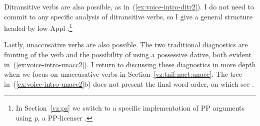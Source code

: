 \begin{exe}
\begin{xlist}
\begin{exe}
\begin{xlist}
\begin{exe}
\begin{xlist}
\begin{exe}
\begin{exe}
\begin{xlist}
\begin{exe}
\begin{xlist}
\begin{exe}
\begin{xlist}
\begin{exe}
\begin{xlist}
\begin{exe}
\begin{xlist}
\begin{exe}
\begin{xlist}
\begin{exe}
\begin{xlist}
\begin{exe}
\begin{xlist}
\begin{xlist}
\begin{exe}
\begin{xlist}
\begin{exe}
\begin{xlist}
\begin{exe}
\begin{xlist}
\begin{exe}
\begin{xlist}
\begin{exe}
\begin{xlist}
\begin{exe}
\begin{xlist}
Ditransitive verbs are also possible, as in~(\ref{ex:voice-intro-ditr2}). I do not need to commit to any specific analysis of ditransitive verbs, so I give a general structure headed by low Appl \citep[18]{pylkkanen08}.\footnote{In Section~\ref{vz:pz} we switch to a specific implementation of PP arguments using \emph{p}, a PP-licenser \citep{koopman97,svenonius03,gehrke08phd,wood15springer}.}

 \begin{exe}
 \ex \label{ex:voice-intro-ditr2} 
 \begin{xlist} 
	
 	 \z
\z 

Lastly, unaccusative verbs are also possible. The two traditional diagnostics are fronting of the verb and the possibility of using a possessive dative, both evident in~(\ref{ex:voice-intro-unacc2}). I return to discussing these diagnostics in more depth when we focus on unaccusative verbs in Section~\ref{vz:tnif:nact:unacc}. The tree in~(\ref{ex:voice-intro-unacc2}b) does not present the final word order, on which see \cite{preminger10}.

 \begin{exe}
 \ex \label{ex:voice-intro-unacc2} 
 \begin{xlist} 
	

\end{xlist}
\end{exe}
\end{xlist}
\end{exe}
\end{xlist}
\end{exe}
\end{xlist}
\end{exe}
\end{xlist}
\end{exe}
\end{xlist}
\end{exe}
\end{xlist}
\end{exe}
\end{xlist}
\end{exe}
\end{xlist}
\end{xlist}
\end{exe}
\end{xlist}
\end{exe}
\end{xlist}
\end{exe}
\end{xlist}
\end{exe}
\end{xlist}
\end{exe}
\end{xlist}
\end{exe}
\end{xlist}
\end{exe}
\end{xlist}
\end{exe}
\end{exe}
\end{xlist}
\end{exe}
\end{xlist}
\end{exe}
\end{xlist}
\end{exe}
